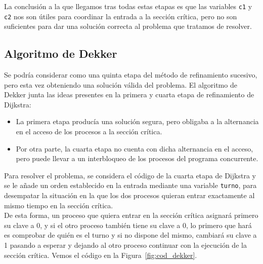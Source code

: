 La conclusión a la que llegamos tras todas estas etapas es que las variables \verb|c1| y \verb|c2| nos son útiles para coordinar la entrada a la sección crítica, pero no son suficientes para dar una solución correcta al problema que tratamos de resolver.\\

\subsection{Algoritmo de Dekker}
Se podría considerar como una quinta etapa del método de refinamiento sucesivo, pero esta vez obteniendo una solución válida del problema. El algoritmo de Dekker junta las ideas presentes en la primera y cuarta etapa de refinamiento de Dijkstra:
\begin{itemize}
    \item La primera etapa producía una solución segura, pero obligaba a la alternancia en el acceso de los procesos a la sección crítica.
    \item Por otra parte, la cuarta etapa no cuenta con dicha alternancia en el acceso, pero puede llevar a un interbloqueo de los procesos del programa concurrente.
\end{itemize}
Para resolver el problema, se considera el código de la cuarta etapa de Dijkstra y se le añade un orden establecido en la entrada mediante una variable \verb|turno|, para desempatar la situación en la que los dos procesos quieran entrar exactamente al mismo tiempo en la sección crítica.\\

De esta forma, un proceso que quiera entrar en la sección crítica asignará primero su clave a 0, y si el otro proceso también tiene su clave a 0, lo primero que hará es comprobar de quién es el turno y si no dispone del mismo, cambiará su clave a 1 pasando a esperar y dejando al otro proceso continuar con la ejecución de la sección crítica. Vemos el código en la Figura~\ref{fig:cod_dekker}.

